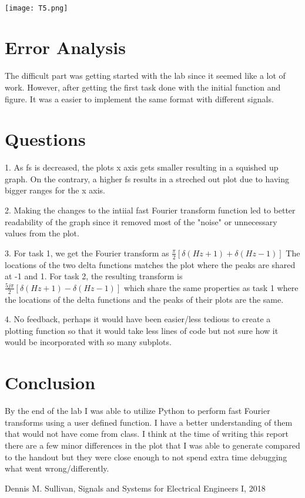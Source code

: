 \documentclass[12pt]{report}
\begin{document}
\\ \texttt{[image: T5.png]}




\section{Error Analysis}

The difficult part was getting started with the lab since it seemed like a lot of work. However, after getting the first task done with the initial function and figure. It was a easier to implement the same format with different signals.

\section{Questions}
1. As fs is decreased, the plots x axis gets smaller resulting in a squished up graph. On the contrary, a higher fs results in a streched out plot due to having bigger ranges for the x axis. 

2. Making the changes to the intiial fast Fourier transform function led to better readability of the graph since it removed most of the "noise" or unnecessary values from the plot.

3. For task 1, we get the Fourier transform as $ \frac{\pi}{2}[\delta (Hz + 1) + \delta (Hz - 1)]$ The locations of the two delta functions matches the plot where the peaks are shared at -1 and 1. For task 2, the resulting transform is $ \frac{5j\pi}{2}[\delta (Hz + 1) - \delta (Hz - 1)]$ which share the same properties as task 1 where the locations of the delta functions and the peaks of their plots are the same. 

4. No feedback, perhaps it would have been easier/less tedious to create a plotting function so that it would take less lines of code but not sure how it would be incorporated with so many subplots.    


\section{Conclusion}

By the end of the lab I was able to utilize Python to perform fast Fourier transforms using a user defined function. I have a better understanding of them that would not have come from class. I think at the time of writing this report there are a few minor differences in the plot that I was able to generate compared to the handout but they were close enough to not spend extra time debugging what went wrong/differently.  

\newpage


\begin{thebibliography}{111}
Dennis M. Sullivan,
Signals and Systems for Electrical Engineers I,
 2018
\end{thebibliography}
\end{document}
